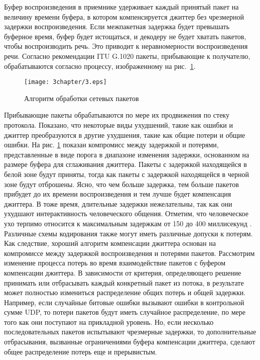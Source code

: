 Буфер воспроизведения в приемнике удерживает каждый принятый пакет на величину времени буфера, в котором компенсируется джиттер без чрезмерной задержки воспроизведения. Если межпакетная задержка будет превышать буферное время, буфер будет истощаться, и декодеру не будет хватать пакетов, чтобы воспроизводить речь. Это приводит к неравномерности воспроизведения речи. 
Согласно рекомендации ITU G.1020 \cite{G1020} пакеты, прибывающие к получателю, обрабатываются согласно процессу, изображенному на рис. \ref{img3:algh_pack}.

\begin{figure} [h]
  \center
\texttt{[image: 3chapter/3.eps]}
  \caption{Алгоритм обработки сетевых пакетов}
  \label{img3:algh_pack}
\end{figure}

Прибывающие пакеты обрабатываются по мере их продвижения по стеку протокола. Показано, что некоторые виды ухудшений, такие как ошибки и джиттер преобразуются в другие ухудшения, такие как общие потери и общие ошибки.
На рис. \ref{img3:algh_pack} показан компромисс между задержкой и потерями, представленные в виде порога в диапазоне изменения задержки, основанном на размере буфера для сглаживания джиттера. Пакеты с задержкой находящейся в белой зоне будут приняты, тогда как пакеты с задержкой находящейся в черной зоне будут отброшены. Ясно, что чем больше задержка, тем больше пакетов прибудет до их времени воспроизведения и тем лучше будет компенсация джиттера. В тоже время, длительные задержки нежелательны, так как они ухудшают интерактивность человеческого общения. Отметим, что человеческое ухо терпимо относится к максимальным задержкам от 150 до 400 миллисекунд \cite{Moon}. Различные схемы кодирования также могут иметь различные допуски к потерям. Как следствие, хороший алгоритм компенсации джиттера основан на компромиссе между задержкой воспроизведения и потерями пакетов.
Рассмотрим изменение процесса потерь во время взаимодействие пакетов с буфером компенсации джиттера. В зависимости от критерия, определяющего решение принимать или отбрасывать каждый конкретный пакет из потока, в результате может полностью измениться распределение общих потерь и общей задержки. Например, если случайные битовые ошибки вызывают ошибки в контрольной сумме UDP, то потери пакетов будут иметь случайное распределение, по мере того как они поступают на прикладной уровень. Но, если несколько последовательных пакетов испытывают чрезмерные задержки, то дополнительные отбрасывания, вызванные ограничениями буфера компенсации джиттера, сделают общее распределение потерь еще и прерывистым.
